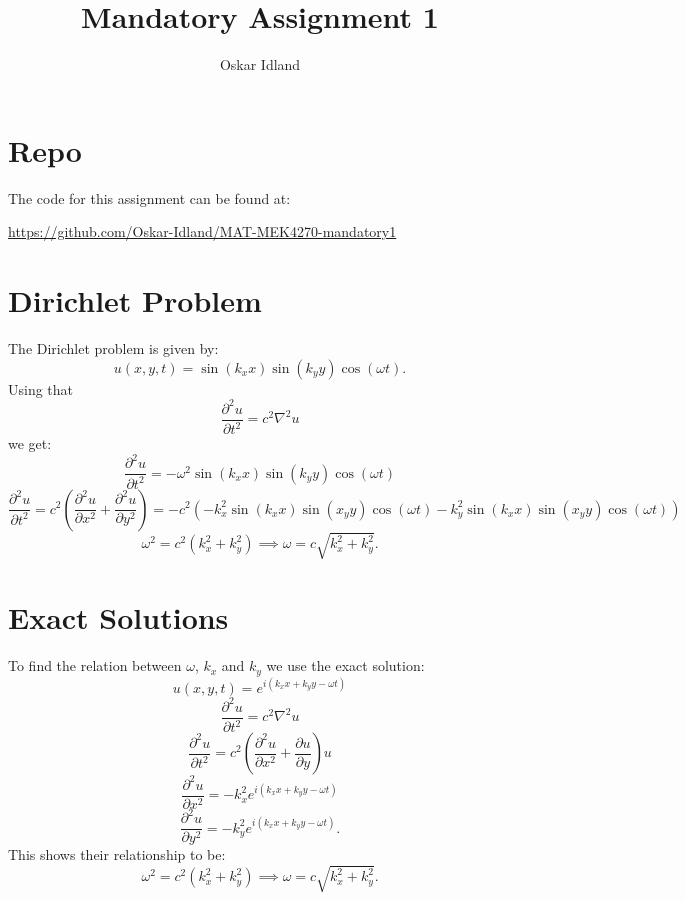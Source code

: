 \documentclass{article}
\author{Oskar Idland}
\title{Mandatory Assignment 1}
\date{}
\begin{document}
\maketitle

\section*{Repo}
The code for this assignment can be found at: 

\url{https://github.com/Oskar-Idland/MAT-MEK4270-mandatory1}

\section*{Dirichlet Problem}
The Dirichlet problem is given by:
\[
u(x, y, t) = \sin(k_xx) \sin(k_yy) \cos(ωt).
\]
Using that 
\[
\frac{∂^2u}{∂t^2} = c^2∇^2u 
\]
we get:
\[
\frac{∂^2u}{∂t^2} = -ω^2 \sin(k_xx) \sin(k_yy) \cos(ωt)
\]
\[
\frac{∂^2u}{∂t^2} = c^2 \left(\frac{∂^2u}{∂x^2} + \frac{∂^2u}{∂y^2}\right) = -c^2 \left(-k_x^2 \sin (k_xx) \sin(x_yy) \cos(ωt)  -k_y^2 \sin (k_xx) \sin(x_yy) \cos(ωt)\right)
\]
\[
ω^2 = c^2(k_x^2 + k_y^2) ⟹ ω = c\sqrt{k_x^2 + k_y^2}.
\]


\section*{Exact Solutions}
To find the relation between $ω$, $k_x$ and $k_y$ we use the exact solution:
\[
u(x, y, t) = e^{i(k_xx + k_yy - ωt)}
\]
\[
\frac{∂^2u}{∂ t^2} = c^2∇^2u
\]
\[
\frac{∂^2u}{∂t^2} = c^2 \left(\frac{∂^2u}{∂x^2} + \frac{∂u}{∂y}\right)u
\]
\[
\frac{∂^2u}{∂ x^2} = -k_x^2 e^{i(k_xx + k_yy - ωt)}
\]
\[
\frac{∂^2u}{∂ y^2} = -k_y^2 e^{i(k_xx + k_yy - ωt)}.
\]
This shows their relationship to be: 
\[
ω^2 = c^2(k_x^2 + k_y^2) ⟹ ω = c\sqrt{k_x^2 + k_y^2}.
\]
\end{document}
